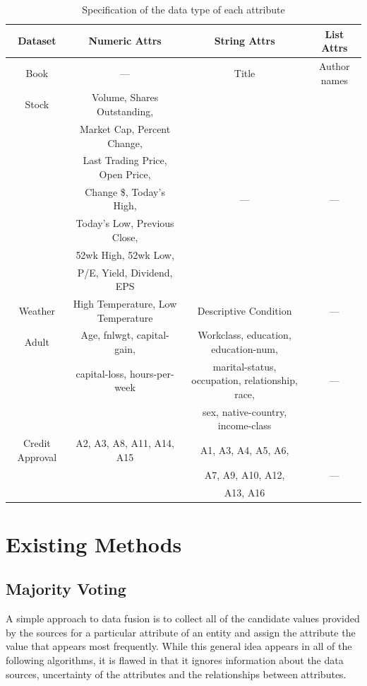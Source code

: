 \documentclass{acm_proc_article-sp}
\begin{document}
\begin{table}[t]
\small
\centering
\begin{tabular}{|c|c|c|c|}
\hline
\textbf{Dataset} & \bf Numeric Attrs & \bf  String Attrs & \bf List Attrs\\
\hline
Book & ---  & Title &Author names \\
\hline
Stock & Volume, Shares Outstanding, &   &  \\
& Market Cap, Percent Change, & & \\
&  Last Trading Price, Open Price, && \\
& Change \$, Today's High, & ---  & --- \\
& Today's Low, Previous Close, && \\
& 52wk High, 52wk Low, && \\
& P/E, Yield, Dividend, EPS & & \\
\hline
Weather &  High Temperature, Low Temperature & Descriptive Condition & ---  \\
\hline
Adult & Age, fnlwgt, capital-gain, & Workclass, education, education-num, &   \\
& capital-loss, hours-per-week & marital-status, occupation, relationship, race, & ---\\
& & sex, native-country, income-class & \\
\hline
Credit Approval &  A2, A3, A8, A11, A14, A15 & A1, A3, A4, A5, A6,  & \\
& & A7, A9, A10, A12,  & ---  \\
& & A13, A16  & \\
\hline
\end{tabular}
\caption{Specification of the data type of each attribute}
\label{fig:datatype} 
\end{table}


\section{Existing Methods}

\subsection{Majority Voting}

A simple approach to data fusion is to collect all of the candidate values provided by the sources for a particular attribute of an entity and assign the attribute the value that appears most frequently. While this general idea appears in all of the following   algorithms,  it is flawed in that it ignores information about the data sources, uncertainty of the attributes and the relationships between  attributes.
\end{document}
